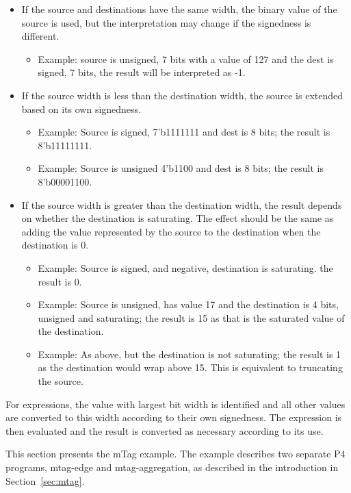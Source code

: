 \documentclass[12pt]{article}
\begin{document}
\begin{itemize}
\begin{itemize}
\item
If the source and destinations have the same width, the binary value
of the source is used, but the interpretation may change if the
signedness is different.
\begin{itemize}
\item
Example: source is unsigned, 7 bits with a value of 127 and the dest
is signed, 7 bits, the result will be interpreted as -1.
\end{itemize}
\item
If the source width is less than the destination width, the source is
extended based on its own signedness.
\begin{itemize}
\item
Example: Source is signed, 7'b1111111 and dest is 8 bits; the result is 
8'b11111111.
\item
Example: Source is unsigned 4'b1100 and dest is 8 bits; the result is
8'b00001100.
\end{itemize}
\item
If the source width is greater than the destination width, the result
depends on whether the destination is saturating.  The effect should
be the same as adding the value represented by the source to the
destination when the destination is 0.
\begin{itemize}
\item
Example: Source is signed, and negative, destination is
saturating. the result is 0.
\item
Example: Source is unsigned, has value 17 and the destination is 4
bits, unsigned and saturating; the result is 15 as that is the
saturated value of the destination.
\item
Example: As above, but the destination is not saturating; the result is 1 
as the destination would wrap above 15. This is equivalent to truncating the 
source.
\end{itemize}
\end{itemize}


For expressions, the value with largest bit width is identified and
all other values are converted to this width according to their own
signedness.  The expression is then evaluated and the result is
converted as necessary according to its use.



This section presents the mTag example. The example describes two separate 
P4 programs, mtag-edge and mtag-aggregation, as described in the introduction 
in Section~\ref{sec:mtag}.


\end{itemize}
\end{document}
